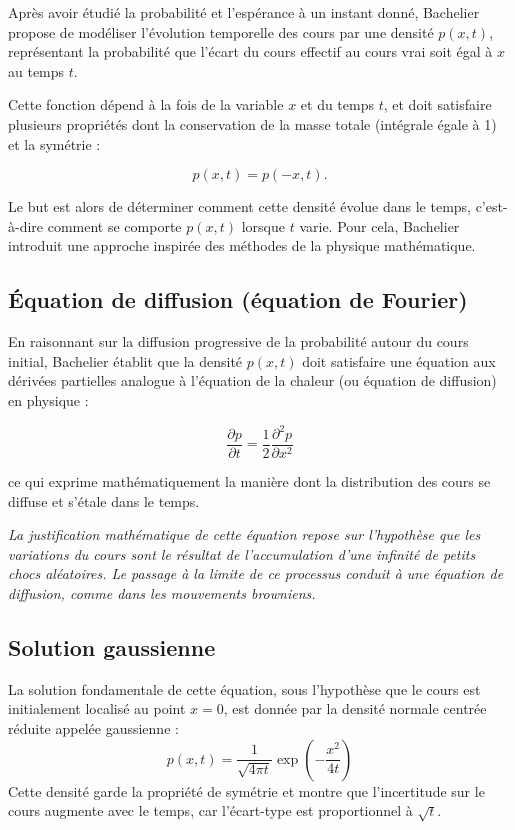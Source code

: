 \documentclass[12pt,a4paper]{article}
\begin{document}
Après avoir étudié la probabilité et l’espérance à un instant donné, Bachelier propose de modéliser l’évolution temporelle des cours par une densité \( p(x,t) \), représentant la probabilité que l’écart du cours effectif au cours vrai soit égal à \( x \) au temps \( t \).

Cette fonction dépend à la fois de la variable \( x \) et du temps \( t \), et doit satisfaire plusieurs propriétés dont la conservation de la masse totale (intégrale égale à 1) et la symétrie :

\[
p(x,t) = p(-x,t).
\]

Le but est alors de déterminer comment cette densité évolue dans le temps, c’est-à-dire comment se comporte $p(x,t)$ lorsque $t$ varie. Pour cela, Bachelier introduit une approche inspirée des méthodes de la physique mathématique.

\subsection{Équation de diffusion (équation de Fourier)}

En raisonnant sur la diffusion progressive de la probabilité autour du cours initial, Bachelier établit que la densité $p(x,t)$ doit satisfaire une équation aux dérivées partielles analogue à l’équation de la chaleur (ou équation de diffusion) en physique :

\[
\frac{\partial p}{\partial t} = \frac{1}{2} \frac{\partial^2 p}{\partial x^2}
\]

ce qui exprime mathématiquement la manière dont la distribution des cours se diffuse et s’étale dans le temps.

\textit{
La justification mathématique de cette équation repose sur l’hypothèse que les variations du cours sont le résultat de l’accumulation d’une infinité de petits chocs aléatoires. Le passage à la limite de ce processus conduit à une équation de diffusion, comme dans les mouvements browniens.
}

\subsection{Solution gaussienne}

La solution fondamentale de cette équation, sous l’hypothèse que le cours est initialement localisé au point $x = 0$, est donnée par la densité normale centrée réduite appelée gaussienne :
\[
p(x,t) = \frac{1}{\sqrt{4\pi t}} \exp\left(-\frac{x^2}{4t}\right)
\]
Cette densité garde la propriété de symétrie et montre que l’incertitude sur le cours augmente avec le temps, car l’écart-type est proportionnel à \(\sqrt{t}\).
\end{document}
